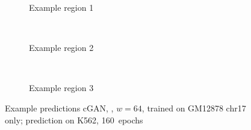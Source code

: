 \begin{figure}[p] %
    \scriptsize{}
    \begin{subfigure}{\textwidth}
        \centering
        \caption{Example  region 1} \label{fig:results:GAN64-17single_r1}
    \end{subfigure}\\[3mm]
    \begin{subfigure}{\textwidth}
        \centering
        \caption{Example region 2} \label{fig:results:GAN64-17single_r2}
    \end{subfigure}\\[3mm]
    \begin{subfigure}{\textwidth}
        \centering
        \caption{Example region 3} \label{fig:results:GAN64-17single_r3}
    \end{subfigure}
    \caption{Example predictions cGAN, , $w=64$, trained on GM12878 chr17 only; prediction on K562, 160~epochs} 
     \label{fig:results:GAN64-17single_matrices}
\end{figure}
\clearpage

